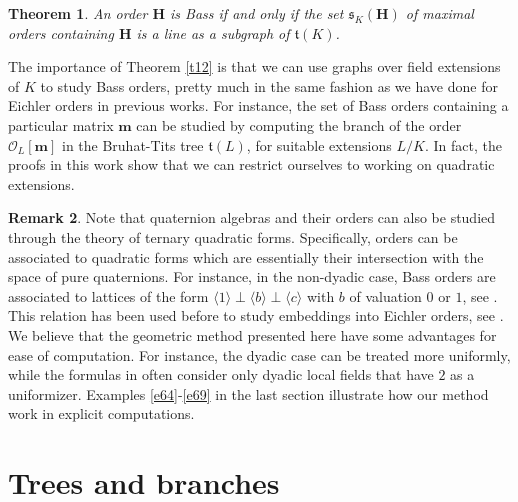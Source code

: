 \documentclass{amsart}
\newtheorem{theorem}{Theorem}[section] %
\theoremstyle{definition}
\newtheorem{remark}[theorem]{Remark}
\newcommand\oink{\mathcal O}
\newcommand\Ha{\mathbf{H}}
\begin{document}
\begin{theorem}\label{t11}
An order $\Ha$ is Bass if and only if the set 
$\mathfrak{s}_K(\Ha)$ of maximal orders
containing $\Ha$ is a line as a subgraph of
$\mathfrak{t}(K)$.
\end{theorem}

The importance of Theorem \ref{t12} is that we can use graphs
over field extensions of $K$ to study Bass orders, pretty much
in the same fashion as we have done for Eichler orders in
previous works. For instance, the
set of  Bass orders containing
a particular matrix $\mathbf{m}$ can be studied by computing 
the branch of the order $\oink_L[\mathbf{m}]$ in the
Bruhat-Tits tree $\mathfrak{t}(L)$, for suitable extensions
$L/K$. In fact, the proofs in this work show that we can
restrict ourselves to working on quadratic extensions.

\begin{remark}
    Note that quaternion algebras and 
    their orders can also 
    be studied through the theory of 
    ternary quadratic forms. 
    Specifically, orders can be 
    associated to quadratic forms
    which are essentially their 
    intersection with the space of 
    pure quaternions. For instance,
    in the non-dyadic case, Bass orders
    are associated to lattices of the form
    $\langle1\rangle\perp\langle b\rangle
    \perp\langle c\rangle$ with $b$ of valuation
    $0$ or $1$, see \cite[Prop. 5.8]{Lem}. 
    This relation has been used before to
    study embeddings into Eichler orders,
    see \cite{Chan}. We believe that
    the geometric method presented here have some
    advantages for ease of computation. 
    For instance, the dyadic case can be treated
    more uniformly, while the formulas
    in \cite[\S5]{Lem} often consider
    only dyadic local fields that have
    $2$ as a uniformizer.
    Examples  \ref{e64}-\ref{e69}
    in the last section illustrate 
    how our method work in explicit 
    computations.
\end{remark}



\section{Trees and branches}
\end{document}
